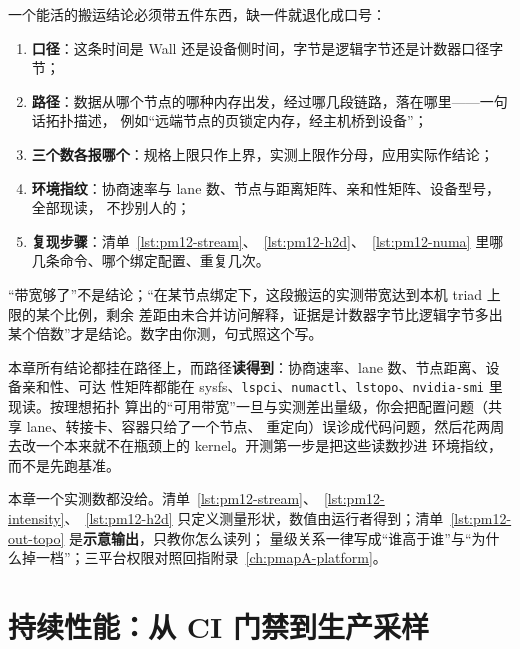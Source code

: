 \documentclass[12pt,a4paper,fontset=fandol]{ctexbook}
\newcommand{\Tp}[1]{\texttt{#1}}
\newcommand{\Lang}[1]{\textsf{#1}}
\newcommand{\MWall}{\Lang{Wall}}
\begin{document}
\begin{bestpractice}[title={把``数据在哪''写进结论}]
一个能活的搬运结论必须带五件东西，缺一件就退化成口号：
\begin{enumerate}
\item \textbf{口径}：这条时间是 \MWall{} 还是设备侧时间，字节是逻辑字节还是计数器口径字节；
\item \textbf{路径}：数据从哪个节点的哪种内存出发，经过哪几段链路，落在哪里——一句话拓扑描述，
  例如``远端节点的页锁定内存，经主机桥到设备''；
\item \textbf{三个数各报哪个}：规格上限只作上界，实测上限作分母，应用实际作结论；
\item \textbf{环境指纹}：协商速率与 lane 数、节点与距离矩阵、亲和性矩阵、设备型号，全部现读，
  不抄别人的；
\item \textbf{复现步骤}：清单~\ref{lst:pm12-stream}、~\ref{lst:pm12-h2d}、~\ref{lst:pm12-numa}
  里哪几条命令、哪个绑定配置、重复几次。
\end{enumerate}
``带宽够了''不是结论；``在某节点绑定下，这段搬运的实测带宽达到本机 triad 上限的某个比例，剩余
差距由未合并访问解释，证据是计数器字节比逻辑字节多出某个倍数''才是结论。数字由你测，句式照这个写。
\end{bestpractice}

\begin{warning}[title={``拓扑我不知道，先按理想算''}]
本章所有结论都挂在路径上，而路径\textbf{读得到}：协商速率、lane 数、节点距离、设备亲和性、可达
性矩阵都能在 sysfs、\Tp{lspci}、\Tp{numactl}、\Tp{lstopo}、\Tp{nvidia-smi} 里现读。按理想拓扑
算出的``可用带宽''一旦与实测差出量级，你会把配置问题（共享 lane、转接卡、容器只给了一个节点、
重定向）误诊成代码问题，然后花两周去改一个本来就不在瓶颈上的 kernel。开测第一步是把这些读数抄进
环境指纹，而不是先跑基准。
\end{warning}

\begin{note}[title={本章的数字从哪来}]
本章一个实测数都没给。清单~\ref{lst:pm12-stream}、~\ref{lst:pm12-intensity}、~\ref{lst:pm12-h2d}
只定义测量形状，数值由运行者得到；清单~\ref{lst:pm12-out-topo} 是\textbf{示意输出}，只教你怎么读列；
量级关系一律写成``谁高于谁''与``为什么掉一档''；三平台权限对照回指附录~\ref{ch:pmapA-platform}。
\end{note}

\part{持续性能：从 CI 门禁到生产采样}
\end{document}
